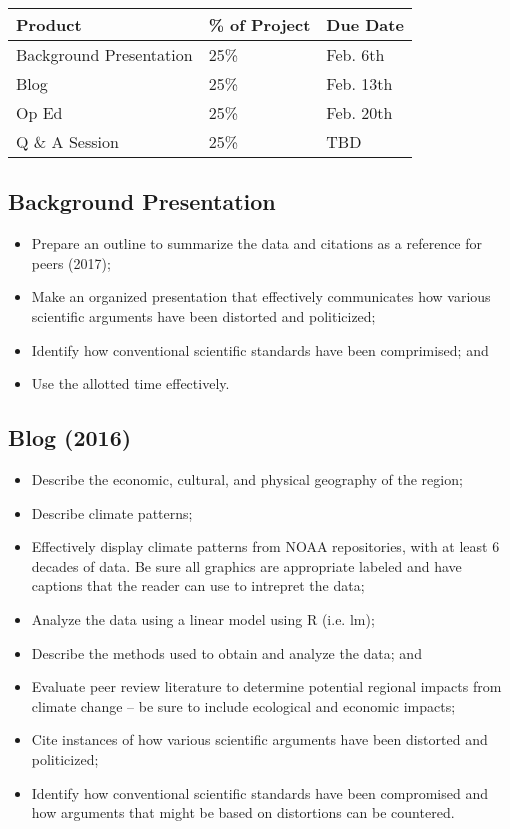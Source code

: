 \documentclass{article}\usepackage[]{graphicx}\usepackage[]{color}
\begin{document}
\begin{table}
\begin{tabular}{lll}\hline
Product                 & \% of Project   & Due Date \\\hline\hline
Background Presentation & 25\%            & Feb. 6th \\
Blog                    & 25\%            & Feb. 13th \\
Op Ed                   & 25\%            & Feb. 20th \\
Q \& A Session          & 25\%            & TBD \\ \hline

\end{tabular}
\end{table}

\subsection{Background Presentation}

\begin{itemize}
  \item Prepare an outline to summarize the data and citations as a reference for peers (2017);
  \item Make an organized presentation that effectively communicates how various scientific arguments have been distorted and politicized;
  \item Identify how conventional scientific standards have been comprimised; and
  \item Use the allotted time effectively. 
  
\end{itemize}


\subsection{Blog (2016)}

\begin{itemize}
  \item Describe the economic, cultural, and physical geography of the region;
  \item Describe climate patterns;
  \item Effectively display climate patterns from NOAA repositories, with at least 6 decades of data. Be sure all graphics are appropriate labeled and have captions that the reader can use to intrepret the data;
  \item Analyze the data using a linear model using R (i.e. lm);
  \item Describe the methods used to obtain and analyze the data; and
  \item Evaluate peer review literature to determine potential regional impacts from climate change -- be sure to include ecological and economic impacts; 
  \item Cite instances of how various scientific arguments have been distorted and politicized;
  \item Identify how conventional scientific standards have been compromised and how arguments that might be based on distortions can be countered.
\end{itemize}
\end{document}
